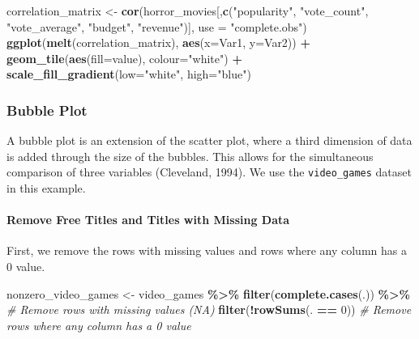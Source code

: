 \documentclass[
]{book}
\newenvironment{Shaded}{\begin{snugshade}}{\end{snugshade}}
\newcommand{\AttributeTok}[1]{\textcolor[rgb]{0.13,0.29,0.53}{#1}}
\newcommand{\CommentTok}[1]{\textcolor[rgb]{0.56,0.35,0.01}{\textit{#1}}}
\newcommand{\DecValTok}[1]{\textcolor[rgb]{0.00,0.00,0.81}{#1}}
\newcommand{\FunctionTok}[1]{\textcolor[rgb]{0.13,0.29,0.53}{\textbf{#1}}}
\newcommand{\NormalTok}[1]{#1}
\newcommand{\OtherTok}[1]{\textcolor[rgb]{0.56,0.35,0.01}{#1}}
\newcommand{\SpecialCharTok}[1]{\textcolor[rgb]{0.81,0.36,0.00}{\textbf{#1}}}
\newcommand{\StringTok}[1]{\textcolor[rgb]{0.31,0.60,0.02}{#1}}
\begin{document}
\begin{Shaded}
\begin{Highlighting}[]
\NormalTok{correlation\_matrix }\OtherTok{\textless{}{-}} \FunctionTok{cor}\NormalTok{(horror\_movies[,}\FunctionTok{c}\NormalTok{(}\StringTok{"popularity"}\NormalTok{, }\StringTok{"vote\_count"}\NormalTok{, }\StringTok{"vote\_average"}\NormalTok{, }\StringTok{"budget"}\NormalTok{, }\StringTok{"revenue"}\NormalTok{)], }\AttributeTok{use =} \StringTok{"complete.obs"}\NormalTok{)}
\FunctionTok{ggplot}\NormalTok{(}\FunctionTok{melt}\NormalTok{(correlation\_matrix), }\FunctionTok{aes}\NormalTok{(}\AttributeTok{x=}\NormalTok{Var1, }\AttributeTok{y=}\NormalTok{Var2)) }\SpecialCharTok{+}
  \FunctionTok{geom\_tile}\NormalTok{(}\FunctionTok{aes}\NormalTok{(}\AttributeTok{fill=}\NormalTok{value), }\AttributeTok{colour=}\StringTok{"white"}\NormalTok{) }\SpecialCharTok{+}
  \FunctionTok{scale\_fill\_gradient}\NormalTok{(}\AttributeTok{low=}\StringTok{"white"}\NormalTok{, }\AttributeTok{high=}\StringTok{"blue"}\NormalTok{)}
\end{Highlighting}
\end{Shaded}

\hypertarget{bubble-plot}{%
\subsubsection*{Bubble Plot}\label{bubble-plot}}

A bubble plot is an extension of the scatter plot, where a third dimension of data is added through the size of the bubbles. This allows for the simultaneous comparison of three variables (Cleveland, 1994). We use the \texttt{video\_games} dataset in this example.

\hypertarget{remove-free-titles-and-titles-with-missing-data}{%
\paragraph{Remove Free Titles and Titles with Missing Data}\label{remove-free-titles-and-titles-with-missing-data}}

First, we remove the rows with missing values and rows where any column has a 0 value.

\begin{Shaded}
\begin{Highlighting}[]
\NormalTok{nonzero\_video\_games }\OtherTok{\textless{}{-}}\NormalTok{ video\_games }\SpecialCharTok{\%\textgreater{}\%}
  \FunctionTok{filter}\NormalTok{(}\FunctionTok{complete.cases}\NormalTok{(.)) }\SpecialCharTok{\%\textgreater{}\%}  \CommentTok{\# Remove rows with missing values (NA)}
  \FunctionTok{filter}\NormalTok{(}\SpecialCharTok{!}\FunctionTok{rowSums}\NormalTok{(. }\SpecialCharTok{==} \DecValTok{0}\NormalTok{))  }\CommentTok{\# Remove rows where any column has a 0 value}
\end{Highlighting}
\end{Shaded}
\end{document}
